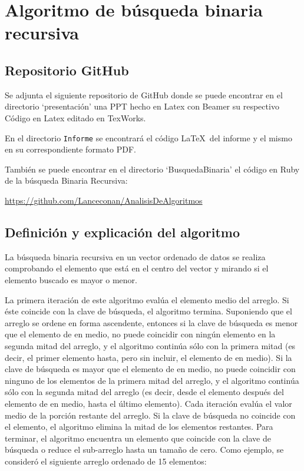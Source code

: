 
\section{Algoritmo de búsqueda binaria recursiva}

\subsection{Repositorio GitHub}

Se adjunta el siguiente repositorio de GitHub donde se puede encontrar en el directorio ‘presentación’ una PPT hecho en Latex con Beamer su respectivo Código en Latex editado en TexWorks. 

En el directorio \texttt{Informe} se encontrará el código \LaTeX \ del informe y el mismo en su correspondiente formato PDF.

También se puede encontrar en el directorio ‘BusquedaBinaria’ el código en Ruby de la búsqueda Binaria Recursiva:\\

{\centerline{\url{https://github.com/Lanceconan/AnalisisDeAlgoritmos}}}

\subsection{Definición y explicación del algoritmo}

La búsqueda binaria recursiva en un vector ordenado de datos se realiza comprobando el elemento que está en el centro del vector y mirando si el elemento buscado es mayor o menor. 

La primera iteración de este algoritmo evalúa el elemento medio del arreglo. Si éste coincide con la clave de búsqueda, el algoritmo termina. Suponiendo que el arreglo se ordene en forma ascendente, entonces si la clave de búsqueda es menor que el elemento de en medio, no puede coincidir con ningún elemento en la segunda mitad del arreglo, y el algoritmo continúa sólo con la primera mitad (es decir, el primer elemento hasta, pero sin incluir, el elemento de en medio). Si la clave de búsqueda es mayor que el elemento de en medio, no puede coincidir con ninguno de los elementos de la primera mitad del arreglo, y el algoritmo continúa sólo con la segunda mitad del arreglo (es decir, desde el elemento después del elemento de en medio, hasta el último elemento). Cada iteración evalúa el valor medio de la porción restante del arreglo. Si la clave de búsqueda no coincide con el elemento, el algoritmo elimina la mitad de los elementos restantes. Para terminar, el algoritmo encuentra un elemento que coincide con la clave de búsqueda o reduce el sub-arreglo hasta un tamaño de cero. Como ejemplo, se consideró el siguiente arreglo ordenado de 15 elementos:\\

